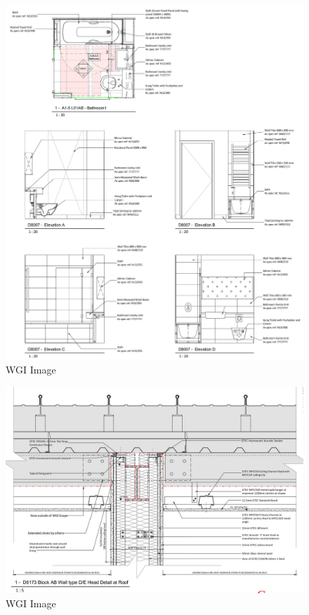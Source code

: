 \documentclass[
]{article}
\begin{document}
\begin{figure}[H]

{\centering \includegraphics{assets/WGI/WGI-BSC-Detail1.jpg}

}

\caption{WGI Image}

\end{figure}%
\begin{figure}[H]

{\centering \includegraphics{assets/WGI/WGI-RoofDetail.jpg}

}

\caption{WGI Image}

\end{figure}%
\end{document}
